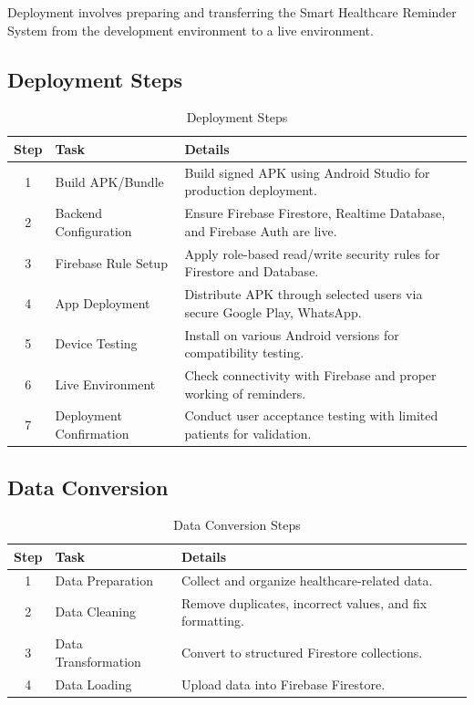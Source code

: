 Deployment involves preparing and transferring the Smart Healthcare Reminder System from the development environment to a live environment.

\subsection{Deployment Steps}

\begin{table}[H]
\centering
\caption{Deployment Steps}
\begin{tabularx}{\textwidth}{|c|l|X|}
\hline
\textbf{Step} & \textbf{Task} & \textbf{Details} \\ \hline
1 & Build APK/Bundle & Build signed APK using Android Studio for production deployment. \\ \hline
2 & Backend Configuration & Ensure Firebase Firestore, Realtime Database, and Firebase Auth are live. \\ \hline
3 & Firebase Rule Setup & Apply role-based read/write security rules for Firestore and Database. \\ \hline
4 & App Deployment & Distribute APK through selected users via secure Google Play, WhatsApp. \\ \hline
5 & Device Testing & Install on various Android versions for compatibility testing. \\ \hline
6 & Live Environment & Check connectivity with Firebase and proper working of reminders. \\ \hline
7 & Deployment Confirmation & Conduct user acceptance testing with limited patients for validation. \\ \hline
\end{tabularx}
\end{table}

\subsection{Data Conversion}

\begin{table}[H]
\centering
\caption{Data Conversion Steps}
\begin{tabularx}{\textwidth}{|c|l|X|}
\hline
\textbf{Step} & \textbf{Task} & \textbf{Details} \\ \hline
1 & Data Preparation & Collect and organize healthcare-related data. \\ \hline
2 & Data Cleaning & Remove duplicates, incorrect values, and fix formatting. \\ \hline
3 & Data Transformation & Convert to structured Firestore collections. \\ \hline
4 & Data Loading & Upload data into Firebase Firestore. \\ \hline
\end{tabularx}
\end{table}


